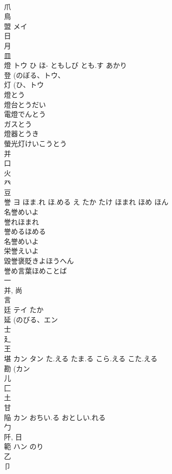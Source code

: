 \documentclass[8pt]{extreport}
\begin{document}
\begin{CJK}{UTF8}{min}
\\	爪 
\\	鳥 
\\	盟	メイ		
\\	日 
\\	月 
\\	皿 
\\	燈	トウ	ひ ほ- ともしび とも.す あかり	
\\	登 (のぼる、トウ、 
\\	灯 (ひ、トウ 
\\	燈とう 
\\	燈台とうだい 
\\	電燈でんとう 
\\	ガスとう 
\\	燈器とうき 
\\	螢光灯けいこうとう 
\\	并 
\\	口 
\\	火 
\\	癶 
\\	豆 
\\	誉	ヨ	ほま.れ ほ.める え たか たけ ほまれ ほめ ほん	
\\	名誉めいよ 
\\	誉れほまれ 
\\	誉めるほめる 
\\	名誉めいよ 
\\	栄誉えいよ 
\\	毀誉褒貶きよほうへん 
\\	誉め言葉ほめことば 
\\	一 
\\	并, 尚 
\\	言 
\\	廷	テイ	たか	
\\	延 (のびる、エン 
\\	士 
\\	廴 
\\	王 
\\	堪	カン タン	た.える たま.る こら.える こた.える	
\\	勘 (カン 
\\	儿 
\\	匚 
\\	土 
\\	甘 
\\	陥	カン	おちい.る おとしい.れる	
\\	勹 
\\	阡, 日 
\\	範	ハン	のり	
\\	乙 
\\	卩 

\end{CJK}
\end{document}

